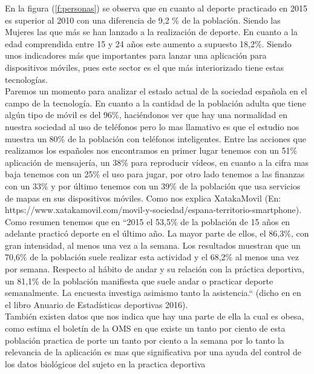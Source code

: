 \documentclass[a4paper, 11pt]{article}
\begin{document}
      En la figura (\ref{f:personas}) se observa que en cuanto al deporte
      practicado en 2015 es superior al 2010 con una diferencia de 9,2 \% de la
      población. Siendo las Mujeres las que más se han lanzado a la realización
      de deporte. En cuanto a la edad comprendida entre 15 y 24 años este aumento
      a supuesto 18,2\%. Siendo unos indicadores más que importantes para lanzar
      una aplicación para dispositivos móviles, pues este sector es el que más
      interiorizado tiene estas tecnologías.\\

      Paremos un momento para analizar el estado actual de la sociedad española
      en el campo de la tecnología. En cuanto a la cantidad de la población adulta
      que tiene algún tipo de móvil es del 96\%, haciéndonos ver que hay una
      normalidad en nuestra sociedad al uso de teléfonos pero lo mas llamativo
      es que el estudio nos muestra un 80\% de la población con teléfonos
      inteligentes. Entre las acciones que realizamos los españoles nos
      encontramos en primer lugar tenemos con un 51\% aplicación de mensajería,
      un 38\% para reproducir vídeos, en cuanto a la cifra mas baja tenemos con
      un 25\% el uso para jugar, por otro lado tenemos a las finanzas con un
      33\% y por último tenemos con un 39\% de la población que usa servicios de
      mapas en sus dispositivos móviles. Como nos explica XatakaMovil (En:
      https://www.xatakamovil.com/movil-y-sociedad/espana-territorio-smartphone).\\

      Como resumen tenemos que en ``2015 el 53,5\% de la población de 15 años en
      adelante practicó deporte en el último año. La mayor parte de ellos, el
      86,3\%, con gran intensidad, al menos una vez a la semana. Los resultados
      muestran que un 70,6\% de la población suele realizar esta actividad y el
      68,2\% al menos una vez por semana. Respecto al hábito de andar y su
      relación con la práctica deportiva, un 81,1\% de la población manifiesta
      que suele andar o practicar deporte semanalmente. La encuesta investiga
      asimismo tanto la asistencia.`` (dicho en en el libro Anuario de
      Estadísticas deportivas 2016).\\

      También existen datos que nos indica que hay una parte de ella la cual
      es obesa, como estima el boletín de la OMS en que existe un tanto
      por ciento de esta población practica de porte un tanto por ciento a la
      semana por lo tanto la relevancia de la aplicación es mas que
      significativa por una ayuda del control de los datos biológicos del sujeto
      en la practica deportiva\\
\end{document}
